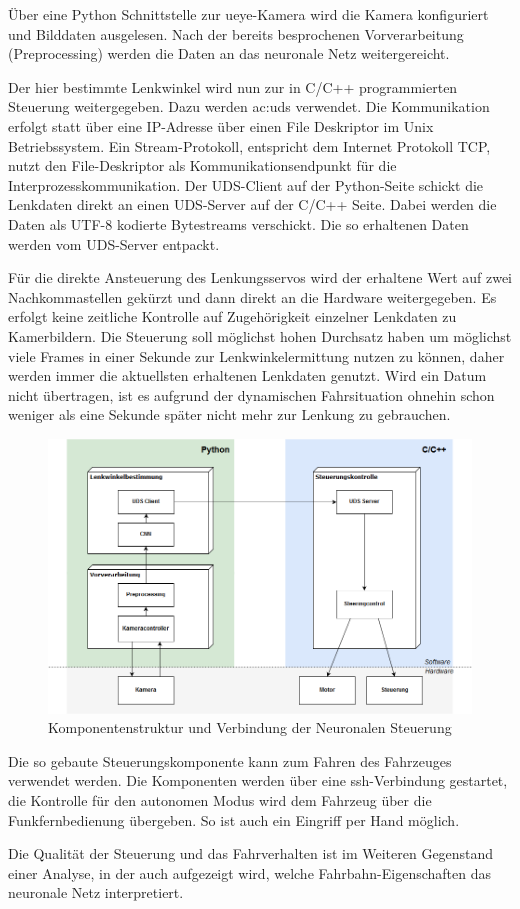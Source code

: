 Über eine Python Schnittstelle zur ueye-Kamera wird die Kamera konfiguriert und Bilddaten ausgelesen. Nach der bereits besprochenen Vorverarbeitung (Preprocessing) werden die Daten an das neuronale Netz weitergereicht.

Der hier bestimmte Lenkwinkel wird nun zur in C/C++ programmierten Steuerung weitergegeben. Dazu werden \gls{ac:uds} verwendet. Die Kommunikation erfolgt statt über eine IP-Adresse über einen File Deskriptor im Unix Betriebssystem. Ein Stream-Protokoll, entspricht dem Internet Protokoll TCP, nutzt den File-Deskriptor als Kommunikationsendpunkt für die Interprozesskommunikation. Der UDS-Client auf der Python-Seite schickt die Lenkdaten direkt an einen UDS-Server auf der C/C++ Seite. Dabei werden die Daten als UTF-8 kodierte Bytestreams verschickt. Die so erhaltenen Daten werden vom UDS-Server entpackt.

Für die direkte Ansteuerung des Lenkungsservos wird der erhaltene Wert auf zwei Nachkommastellen gekürzt und dann direkt an die Hardware weitergegeben. Es erfolgt keine zeitliche Kontrolle auf Zugehörigkeit einzelner Lenkdaten zu Kamerbildern. Die Steuerung soll möglichst hohen Durchsatz haben um möglichst viele Frames in einer Sekunde zur Lenkwinkelermittung nutzen zu können, daher werden immer die aktuellsten erhaltenen Lenkdaten genutzt. Wird ein Datum nicht übertragen, ist es aufgrund der dynamischen Fahrsituation ohnehin schon weniger als eine Sekunde später nicht mehr zur Lenkung zu gebrauchen.

\begin{figure}[h]
	\centering
	\includegraphics[width=1\linewidth]{figures/Steuerung.png}
	\caption{Komponentenstruktur und Verbindung der Neuronalen Steuerung}
	\label{fig:steuerung}
\end{figure}

Die so gebaute Steuerungskomponente kann zum Fahren des Fahrzeuges verwendet werden. Die Komponenten werden über eine ssh-Verbindung gestartet, die Kontrolle für den autonomen Modus wird dem Fahrzeug über die Funkfernbedienung übergeben. So ist auch ein Eingriff per Hand möglich.

Die Qualität der Steuerung und das Fahrverhalten ist im Weiteren Gegenstand einer Analyse, in der auch aufgezeigt wird, welche Fahrbahn-Eigenschaften das neuronale Netz interpretiert.



